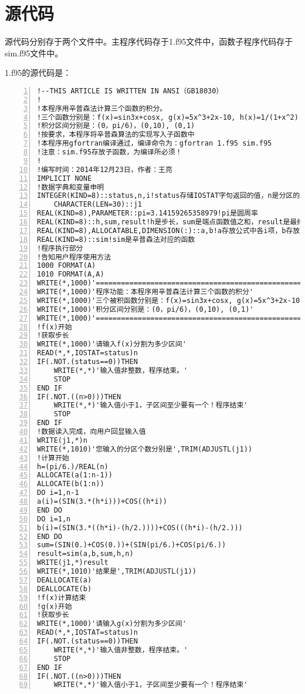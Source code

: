 \documentclass[hyperref,UTF-8]{ctexart}
\begin{document}
\section{源代码}
源代码分别存于两个文件中。主程序代码存于1.f95文件中，函数子程序代码存于sim.f95文件中。

1.f95的源代码是：
\begin{Verbatim}[numbers=left,commandchars=\\\{\},fontsize=\small,frame=single]
!--THIS ARTICLE IS WRITTEN IN ANSI（GB18030）
!
!本程序用辛普森法计算三个函数的积分。
!三个函数分别是：f(x)=sin3x+cosx, g(x)=5x^3+2x-10, h(x)=1/(1+x^2)
!积分区间分别是：(0，pi/6)，(0,10), (0,1)
!按要求，本程序将辛普森算法的实现写入子函数中
!本程序用gfortran编译通过，编译命令为：gfortran 1.f95 sim.f95
!注意：sim.f95存放子函数，为编译所必须！
!
!编写时间：2014年12月23日，作者：王亮
IMPLICIT NONE
!数据字典和变量申明
INTEGER(KIND=8)::status,n,i!status存储IOSTAT字句返回的值，n是分区的总数，i是循环计数器
	CHARACTER(LEN=30)::j1
REAL(KIND=8),PARAMETER::pi=3.14159265358979!pi是圆周率
REAL(KIND=8)::h,sum,result!h是步长，sum是端点函数值之和，result是最终的计算结果
REAL(KIND=8),ALLOCATABLE,DIMENSION(:)::a,b!a存放公式中各i项，b存放公式中各i-1/2项
REAL(KIND=8)::sim!sim是辛普森法对应的函数
!程序执行部分
!告知用户程序使用方法
1000 FORMAT(A)
1010 FORMAT(A,A)
WRITE(*,1000)'======================================================'
WRITE(*,1000)'程序功能：本程序用辛普森法计算三个函数的积分'
WRITE(*,1000)'三个被积函数分别是：f(x)=sin3x+cosx, g(x)=5x^3+2x-10, h(x)=1/(1+x^2)'
WRITE(*,1000)'积分区间分别是：(0，pi/6)，(0,10), (0,1)'
WRITE(*,1000)'======================================================'
!f(x)开始
!获取步长
WRITE(*,1000)'请输入f(x)分割为多少区间'
READ(*,*,IOSTAT=status)n
IF(.NOT.(status==0))THEN
	WRITE(*,*)'输入值非整数，程序结束。'
	STOP
END IF
IF(.NOT.((n>0)))THEN
	WRITE(*,*)'输入值小于1，子区间至少要有一个！程序结束'
	STOP
END IF
!数据读入完成，向用户回显输入值
WRITE(j1,*)n
WRITE(*,1010)'您输入的分区个数分别是',TRIM(ADJUSTL(j1))
!计算开始
h=(pi/6.)/REAL(n)
ALLOCATE(a(1:n-1))
ALLOCATE(b(1:n))
DO i=1,n-1
a(i)=(SIN(3.*(h*i)))+COS((h*i))
END DO
DO i=1,n
b(i)=(SIN(3.*((h*i)-(h/2.))))+COS(((h*i)-(h/2.)))
END DO
sum=(SIN(0.)+COS(0.))+(SIN(pi/6.)+COS(pi/6.))
result=sim(a,b,sum,h,n)
WRITE(j1,*)result
WRITE(*,1010)'结果是',TRIM(ADJUSTL(j1))
DEALLOCATE(a)
DEALLOCATE(b)
!f(x)计算结束
!g(x)开始
!获取步长
WRITE(*,1000)'请输入g(x)分割为多少区间'
READ(*,*,IOSTAT=status)n
IF(.NOT.(status==0))THEN
	WRITE(*,*)'输入值非整数，程序结束。'
	STOP
END IF
IF(.NOT.((n>0)))THEN
	WRITE(*,*)'输入值小于1，子区间至少要有一个！程序结束'

\end{Verbatim}
\end{document}
